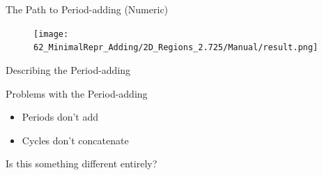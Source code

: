 \begin{frame}{The Path to Period-adding (Numeric)}
	\begin{figure}
		\texttt{[image: 62\_MinimalRepr\_Adding/2D\_Regions\_2.725/Manual/result.png]}
	\end{figure}
\end{frame}

\begin{frame}{Describing the Period-adding}
	\vspace{-1em}
	\begin{figure}
	\end{figure}
\end{frame}

\begin{frame}{Problems with the Period-adding}
	\begin{itemize}
		\item Periods don't add
		\item Cycles don't concatenate
	\end{itemize}
	\pause
	\vspace{3em}
	Is this something different entirely?
\end{frame}
